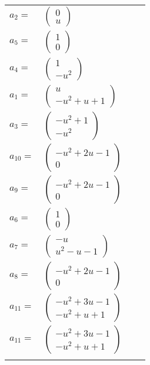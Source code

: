 \documentclass[1p]{elsarticle_modified}
\theoremstyle{definition}
\begin{document}
\begin{tabular}{m{7pt} m{180pt} m{7pt} m{180pt} }
\flushright $a_{2}=$&$\begin{pmatrix}0\\u\end{pmatrix}$ \\
\flushright $a_{5}=$&$\begin{pmatrix}1\\0\end{pmatrix}$ \\
\flushright $a_{4}=$&$\begin{pmatrix}1\\- u^2\end{pmatrix}$ \\
\flushright $a_{1}=$&$\begin{pmatrix}u\\- u^2+u+1\end{pmatrix}$ \\
\flushright $a_{3}=$&$\begin{pmatrix}- u^2+1\\- u^2\end{pmatrix}$ \\
\flushright $a_{10}=$&$\begin{pmatrix}- u^2+2 u-1\\0\end{pmatrix}$ \\
\flushright $a_{9}=$&$\begin{pmatrix}- u^2+2 u-1\\0\end{pmatrix}$ \\
\flushright $a_{6}=$&$\begin{pmatrix}1\\0\end{pmatrix}$ \\
\flushright $a_{7}=$&$\begin{pmatrix}- u\\u^2- u-1\end{pmatrix}$ \\
\flushright $a_{8}=$&$\begin{pmatrix}- u^2+2 u-1\\0\end{pmatrix}$ \\
\flushright $a_{11}=$&$\begin{pmatrix}- u^2+3 u-1\\- u^2+u+1\end{pmatrix}$\\ \flushright $a_{11}=$&$\begin{pmatrix}- u^2+3 u-1\\- u^2+u+1\end{pmatrix}$\\&\end{tabular}
\end{document}
